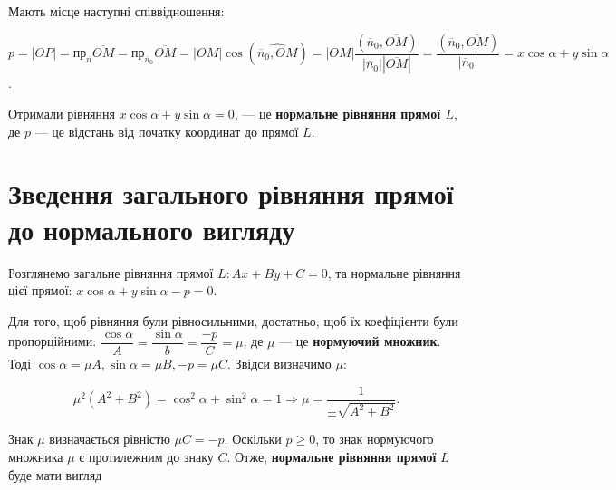 \noindent\parbox{3.7cm}{}
\parbox{\textwidth - 3.8cm}{
	Мають місце наступні співвідношення:

	$p = |OP|
	= \text{пр}_{\overline{n}}\overline{OM} = \text{пр}_{\overline{n}_0}\overline{OM}
	= |OM|\cos(\widehat{\overline{n}_0,OM})
	= |OM|\dfrac{(\overline{n}_0,\overline{OM})}{|\overline{n}_0||\overline{OM}|}
	= \dfrac{(\overline{n}_0,\overline{OM})}{|\overline{n}_0|}
	= x\cos\alpha + y\sin\alpha$.
	
	Отримали рівняння
	$x\cos\alpha + y\sin\alpha = 0$,	
	--- це \textbf{нормальне рівняння прямої $L$}, де $p$ --- це відстань від початку
	координат до прямої $L$.
}

\parbox{\textwidth - 0.6cm}{\section{Зведення загального рівняння прямої до нормального вигляду}}

Розглянемо загальне рівняння прямої $L: Ax + By + C= 0$, та нормальне
рівняння цієї прямої: $x\cos\alpha + y\sin\alpha - p = 0$.

Для того, щоб рівняння були рівносильними, достатньо, щоб їх коефіцієнти
були пропорційними: $\dfrac{\cos\alpha}{A} = \dfrac{\sin\alpha}{b} = \dfrac{-p}{C} = \mu$, де $\mu$ --- це
\textbf{нормуючий множник}. Тоді $\cos\alpha = \mu A, \sin\alpha = \mu B, -p = \mu C$. Звідси визначимо $\mu$:

$$\mu^2(A^2 + B^2) = \cos^2\alpha + \sin^2\alpha = 1 \Rightarrow \mu = \dfrac{1}{\pm\sqrt{A^2 + B^2}}.$$

Знак $\mu$ визначається рівністю $\mu C = -p$. Оскільки $p \geq 0$, то знак нормуючого
множника $\mu$ є протилежним до знаку $C$. Отже, \textbf{нормальне рівняння прямої} $L$ буде
мати вигляд

